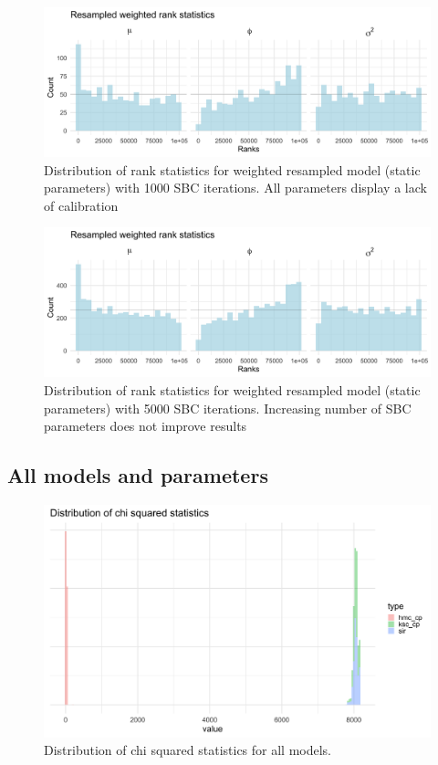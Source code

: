\documentclass[12pt, a4paper]{article}
\begin{document}
    \begin{figure}[H]
        \centering
        \includegraphics[scale=0.1]{results/sir_1k.png}
        \caption{Distribution of rank statistics for weighted resampled model (static parameters) with 1000 SBC iterations. All parameters display a lack of calibration}
    \end{figure}

    \begin{figure}[H]
        \centering
        \includegraphics[scale=0.1]{results/sir_5k.png}
        \caption{Distribution of rank statistics for weighted resampled model (static parameters) with 5000 SBC iterations. Increasing number of SBC parameters does not improve results}
    \end{figure}

    \subsection{All models and parameters}
    \begin{figure}[H]
        \centering
        \includegraphics[scale=0.1]{results/dist_chisq.png}
        \caption{Distribution of chi squared statistics for all models.}
    \end{figure}
\end{document}
